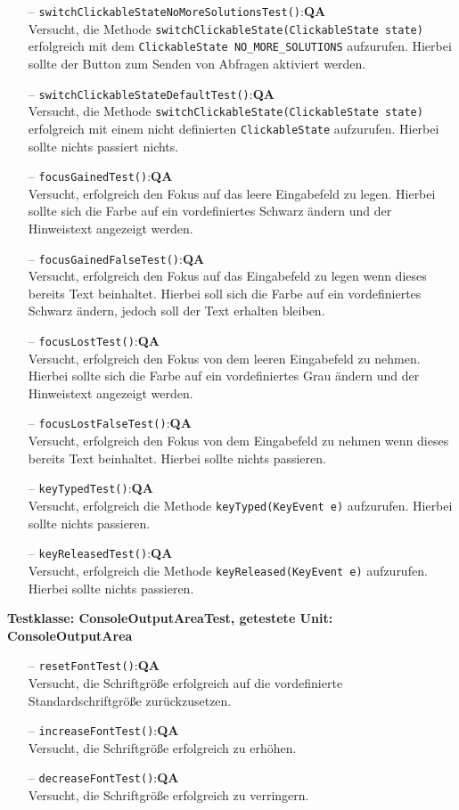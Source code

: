 \documentclass[parskip=full,11pt,twoside]{scrartcl}
\def\qa{\hfill\textbf{QA}}
\begin{document}
\begin{itemize}
	\item[--] \texttt{switchClickableStateNoMoreSolutionsTest()}:\qa\\
	Versucht, die Methode \texttt{switchClickableState(ClickableState state)}\\erfolgreich mit dem \texttt{ClickableState NO\_MORE\_SOLUTIONS} aufzurufen. Hierbei sollte der Button zum Senden von Abfragen aktiviert werden.
	\item[--] \texttt{switchClickableStateDefaultTest()}:\qa\\
	Versucht, die Methode \texttt{switchClickableState(ClickableState state)}\\erfolgreich mit einem nicht definierten \texttt{ClickableState} aufzurufen. Hierbei sollte nichts passiert nichts.
	\item[--] \texttt{focusGainedTest()}:\qa\\
	Versucht, erfolgreich den Fokus auf das leere Eingabefeld zu legen. Hierbei sollte sich die Farbe auf ein vordefiniertes Schwarz ändern und der Hinweistext angezeigt werden.
    \newpage
	\item[--] \texttt{focusGainedFalseTest()}:\qa\\
	Versucht, erfolgreich den Fokus auf das Eingabefeld zu legen wenn dieses bereits Text beinhaltet. Hierbei soll sich die Farbe auf ein vordefiniertes Schwarz ändern, jedoch soll der Text erhalten bleiben.
	\item[--] \texttt{focusLostTest()}:\qa\\
	Versucht, erfolgreich den Fokus von dem leeren Eingabefeld zu nehmen. Hierbei sollte sich die Farbe auf ein vordefiniertes Grau ändern und der Hinweistext angezeigt werden.
	\item[--] \texttt{focusLostFalseTest()}:\qa\\
	Versucht, erfolgreich den Fokus von dem Eingabefeld zu nehmen wenn dieses bereits Text beinhaltet. Hierbei sollte nichts passieren.
	\item[--] \texttt{keyTypedTest()}:\qa\\
	Versucht, erfolgreich die Methode \texttt{keyTyped(KeyEvent e)} aufzurufen. Hierbei sollte nichts passieren.
	\item[--] \texttt{keyReleasedTest()}:\qa\\
	Versucht, erfolgreich die Methode \texttt{keyReleased(KeyEvent e)} aufzurufen. Hierbei sollte nichts passieren.
\end{itemize}

\textbf{Testklasse: ConsoleOutputAreaTest, getestete Unit: ConsoleOutputArea}
\begin{itemize}
	\item[--] \texttt{resetFontTest()}:\qa\\
	Versucht, die Schriftgröße erfolgreich auf die vordefinierte Standardschriftgröße zurückzusetzen.
	\item[--] \texttt{increaseFontTest()}:\qa\\
	Versucht, die Schriftgröße erfolgreich zu erhöhen.
	\item[--] \texttt{decreaseFontTest()}:\qa\\
	Versucht, die Schriftgröße erfolgreich zu verringern.
\end{itemize}
\end{document}
